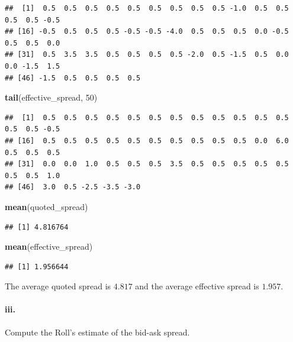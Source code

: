 \documentclass[
]{article}
\newenvironment{Shaded}{\begin{snugshade}}{\end{snugshade}}
\newcommand{\DecValTok}[1]{\textcolor[rgb]{0.00,0.00,0.81}{#1}}
\newcommand{\FunctionTok}[1]{\textcolor[rgb]{0.13,0.29,0.53}{\textbf{#1}}}
\newcommand{\NormalTok}[1]{#1}
\begin{document}
\begin{verbatim}
##  [1]  0.5  0.5  0.5  0.5  0.5  0.5  0.5  0.5  0.5 -1.0  0.5  0.5  0.5  0.5 -0.5
## [16] -0.5  0.5  0.5  0.5 -0.5 -0.5 -4.0  0.5  0.5  0.5  0.0 -0.5  0.5  0.5  0.0
## [31]  0.5  3.5  3.5  0.5  0.5  0.5  0.5 -2.0  0.5 -1.5  0.5  0.0  0.0 -1.5  1.5
## [46] -1.5  0.5  0.5  0.5  0.5
\end{verbatim}

\begin{Shaded}
\begin{Highlighting}[]
\FunctionTok{tail}\NormalTok{(effective\_spread, }\DecValTok{50}\NormalTok{)}
\end{Highlighting}
\end{Shaded}

\begin{verbatim}
##  [1]  0.5  0.5  0.5  0.5  0.5  0.5  0.5  0.5  0.5  0.5  0.5  0.5  0.5  0.5 -0.5
## [16]  0.5  0.5  0.5  0.5  0.5  0.5  0.5  0.5  0.5  0.5  0.0  6.0  0.5  0.5  0.5
## [31]  0.0  0.0  1.0  0.5  0.5  0.5  3.5  0.5  0.5  0.5  0.5  0.5  0.5  0.5  1.0
## [46]  3.0  0.5 -2.5 -3.5 -3.0
\end{verbatim}

\begin{Shaded}
\begin{Highlighting}[]
\FunctionTok{mean}\NormalTok{(quoted\_spread)}
\end{Highlighting}
\end{Shaded}

\begin{verbatim}
## [1] 4.816764
\end{verbatim}

\begin{Shaded}
\begin{Highlighting}[]
\FunctionTok{mean}\NormalTok{(effective\_spread)}
\end{Highlighting}
\end{Shaded}

\begin{verbatim}
## [1] 1.956644
\end{verbatim}

The average quoted spread is \(\mathbf{4.817}\) and the average
effective spread is \(\mathbf{1.957}\).

\paragraph{iii.}\label{iii.}

Compute the Roll's estimate of the bid-ask spread.
\end{document}

